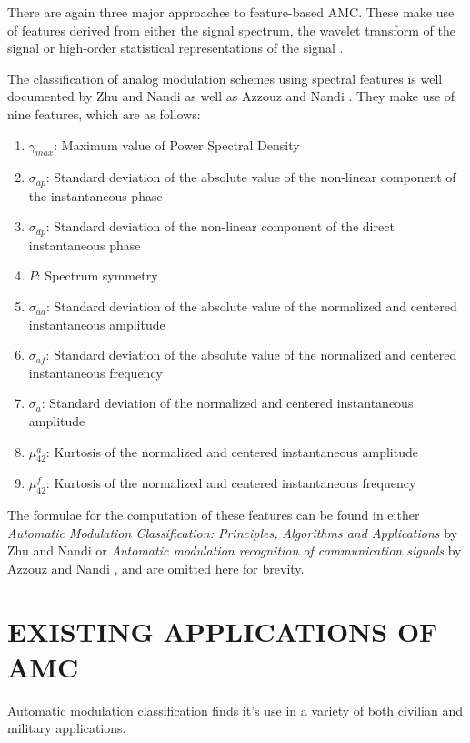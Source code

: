 \documentclass[10pt,twocolumn]{witseiepaper}
\begin{document}
	There are again three major approaches to feature-based AMC. These make use of features derived from either the signal spectrum, the wavelet transform of the signal or high-order statistical representations of the signal \cite{zhu2014automatic}. 
	
	The classification of analog modulation schemes using spectral features is well documented by Zhu and Nandi \cite{zhu2014automatic} as well as Azzouz and Nandi \cite{azzouz2013automatic}. They make use of nine features, which are as follows:

	\begin{enumerate}
		\item $\gamma_{max}$: Maximum value of Power Spectral Density 
		\item $\sigma_{ap}$: Standard deviation of the absolute value of the non-linear component of the instantaneous phase
		\item $\sigma_{dp}$: Standard deviation of the non-linear component of the direct instantaneous phase
		\item $P$: Spectrum symmetry
		\item $\sigma_{aa}$: Standard deviation of the absolute value of the normalized and centered instantaneous amplitude
		\item $\sigma_{af}$: Standard deviation of the absolute value of the normalized and centered instantaneous frequency
		\item $\sigma_{a}$: Standard deviation of the normalized and centered instantaneous amplitude
		\item $\mu_{42}^{a}$: Kurtosis of the normalized and centered instantaneous amplitude
		\item $\mu_{42}^{f}$: Kurtosis of the normalized and centered instantaneous frequency
	\end{enumerate}

	The formulae for the computation of these features can be found in either \textit{Automatic Modulation Classification: Principles, Algorithms and Applications} by Zhu and Nandi \cite{zhu2014automatic} or \textit{Automatic modulation recognition of communication signals} by Azzouz and Nandi \cite{azzouz2013automatic}, and are omitted here for brevity.
	
\section{EXISTING APPLICATIONS OF AMC}
Automatic modulation classification finds it's use in a variety of both civilian and military applications. 
\end{document}

